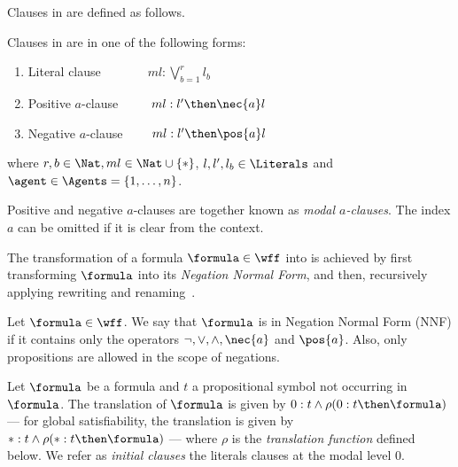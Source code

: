 Clauses in  are defined as follows.

\begin{definition}
    Clauses in  are in one of the following forms:
    \begin{enumerate}
        \item Literal clause $\ \ \quad \qquad ml : \bigvee^r_{b=1} l_b$
        \item Positive $a$-clause $\ \qquad ml : l' \then \nec{a} l$
        \item Negative $a$-clause $\qquad ml : l' \then \pos{a} l$
    \end{enumerate}
    where $r, b \in \Nat, ml \in \Nat \cup \{*\}$, $l, l', l_b \in
    \Literals$ and $\agent \in \Agents = \{1, \ldots, n\}$.
\end{definition}

Positive and negative $a$-clauses are together known as \emph{modal
$a$-clauses}. The index $a$ can be omitted if it is clear from the context.

The transformation of a formula $\formula \in \wff$ into  is achieved
by first transforming $\formula$ into its \emph{Negation Normal Form}, and then,
recursively applying rewriting and renaming~\cite{plaisted1986structure}.

\begin{definition}
    Let $\formula \in \wff$. We say that $\formula$ is in Negation Normal Form (NNF) if
    it contains only the operators $\neg, \lor, \land, \nec{a}$ and $\pos{a}$. Also,
    only propositions are allowed in the scope of negations.
\end{definition}

Let $\formula$ be a formula and $t$ a propositional symbol not occurring in
$\formula$. The translation of $\formula$ is given by $0 : t \land \rho(0 : t
\then \formula)$ --- for global satisfiability, the translation is given by $* :
t \land \rho(* : t \then \formula)$ --- where $\rho$ is the \emph{translation
function} defined below. We refer as \emph{initial clauses} the literals clauses
at the modal level 0. 

